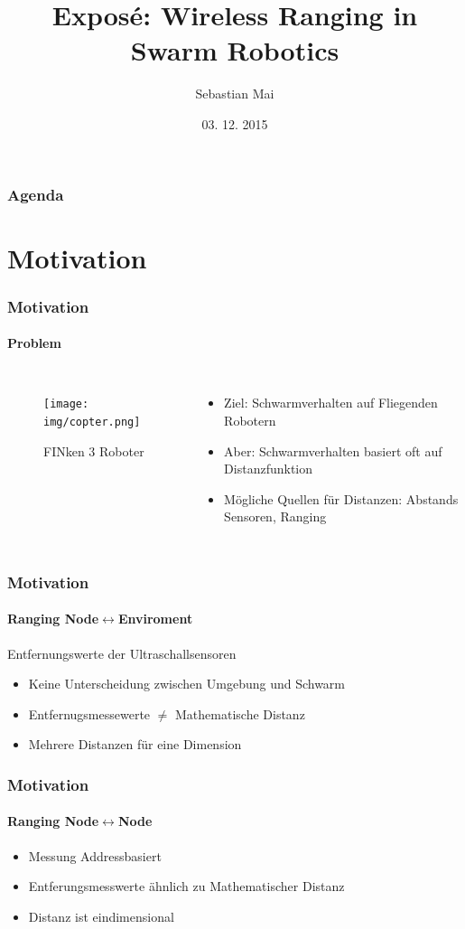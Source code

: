 \documentclass{beamer}
\title{Exposé: Wireless Ranging in Swarm Robotics}
\author{Sebastian Mai}
\date{03. 12. 2015}
\begin{document}
\begin{frame}[plain]
 \titlepage
\end{frame}



\section[Agenda]{}
\begin{frame}
	\frametitle{Agenda}
	\tableofcontents
\end{frame}

\section{Motivation}
\begin{frame}
	\frametitle{Motivation}
	\framesubtitle{Problem}
	\begin{columns}
		\begin{figure}
			\centering
			\texttt{[image: img/copter.png]}
			\caption{FINken 3 Roboter}
		\end{figure}
		\begin{itemize}
			\item Ziel: Schwarmverhalten auf Fliegenden Robotern
			\item Aber: Schwarmverhalten basiert oft auf Distanzfunktion
			\item Mögliche Quellen für Distanzen: Abstands Sensoren, Ranging
		\end{itemize}
	\end{columns}
\end{frame}

\begin{frame}
	\frametitle{Motivation}
	\framesubtitle{Ranging Node$\leftrightarrow$Enviroment}
	Entfernungswerte der Ultraschallsensoren
	\begin{itemize}
		\item Keine Unterscheidung zwischen Umgebung und Schwarm
		\item Entfernugsmessewerte $\neq$ Mathematische Distanz
		\item Mehrere Distanzen für eine Dimension
	\end{itemize}
\end{frame}
\begin{frame}
	\frametitle{Motivation}
	\framesubtitle{Ranging Node$\leftrightarrow$Node}
	\begin{itemize}
		\item Messung Addressbasiert
		\item Entferungsmesswerte ähnlich zu Mathematischer Distanz
		\item Distanz ist eindimensional
	\end{itemize}
\end{frame}
\end{document}
